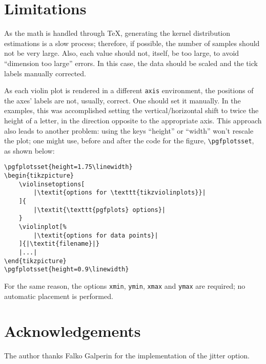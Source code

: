\documentclass{article}
\begin{document}
\section{Limitations}

As the math is handled through \TeX, generating the kernel distribution
estimations is a slow process; therefore, if possible, the number of samples
should not be very large. Also, each value should not, itself, be too large,
to avoid ``dimension too large'' errors. In this case, the data should be scaled
and the tick labels manually corrected.

As each violin plot is rendered in a different \texttt{axis} environment,
the positions of the axes' labels are not, usually, correct. One should
set it manually. In the examples, this was accomplished setting the
vertical/horizontal shift to twice the height of a letter, in the direction
opposite to the appropriate axis. This approach also leads to another problem:
using the keys ``height'' or ``width'' won't rescale the plot; one might use,
before and after the code for the figure, \texttt{\textbackslash pgfplotsset},
as shown below:


\begin{verbatim}
\pgfplotsset{height=1.75\linewidth}
\begin{tikzpicture}
	\violinsetoptions[
		|\textit{options for \texttt{tikzviolinplots}}|
	]{
		|\textit{\texttt{pgfplots} options}|
	}
	\violinplot[%
		|\textit{options for data points}|
	]{|\textit{filename}|}
	|...|
\end{tikzpicture}
\pgfplotsset{height=0.9\linewidth}
\end{verbatim}

For the same reason, the options \texttt{xmin}, \texttt{ymin}, \texttt{xmax}
and \texttt{ymax} are required; no automatic placement is performed.

\section{Acknowledgements}

The author thanks Falko Galperin for the implementation of the jitter option.
\end{document}

